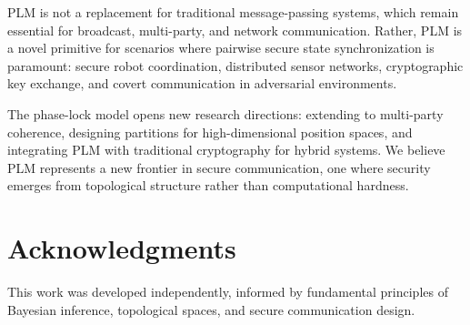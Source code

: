 \documentclass[11pt,a4paper]{article}
\theoremstyle{definition}
\begin{document}
PLM is not a replacement for traditional message-passing systems, which remain essential for broadcast, multi-party, and network communication. Rather, PLM is a novel primitive for scenarios where pairwise secure state synchronization is paramount: secure robot coordination, distributed sensor networks, cryptographic key exchange, and covert communication in adversarial environments.

The phase-lock model opens new research directions: extending to multi-party coherence, designing partitions for high-dimensional position spaces, and integrating PLM with traditional cryptography for hybrid systems. We believe PLM represents a new frontier in secure communication, one where security emerges from topological structure rather than computational hardness.

\section*{Acknowledgments}

This work was developed independently, informed by fundamental principles of Bayesian inference, topological spaces, and secure communication design.



\end{document}
